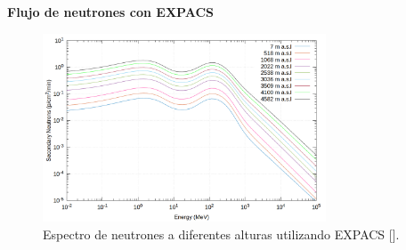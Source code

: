     \begin{frame}{} %
        \justifying %
        \vspace*{-0.3cm} %

        \begin{tcolorbox}[colback=custombgcolor4, coltext=customfgcolor2,
                      colframe=custombgcolor4, %
                      width=\textwidth,       %
                      boxrule=1pt,            %
                      top=0.1mm, bottom=0.1mm,     %
                      sharp corners=all,     %
                      halign=center,         %
                      valign=center,         %
                      ]
            \textbf{Flujo de neutrones con EXPACS}        
        \end{tcolorbox}
        \vspace*{-0.4cm} %
        
        \begin{figure}
            \centering
            \includegraphics[width=0.75\textwidth]{Figures/Neutron_flux.png}
            \caption{\tiny Espectro de neutrones a diferentes alturas utilizando EXPACS [\cite{sedrati2022}].}
        \end{figure}
    \end{frame}

